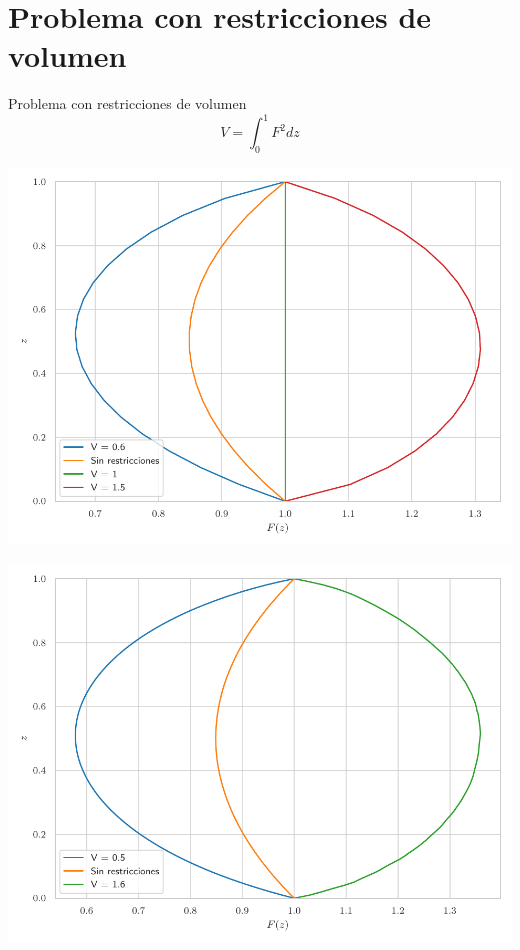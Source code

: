 \documentclass[11pt]{beamer}
\begin{document}
	\section{Problema con restricciones de volumen}
		\begin{frame}{Problema con restricciones de volumen}
			\centering
                \begin{equation*}
                    V = \int_0^1 F^2 dz
                \end{equation*}
			\begin{minipage}[b]{0.48\textwidth}
                    \centering
                    \includegraphics[height=0.5 \textheight]{Figuras/vol_inic.pdf}
                \end{minipage}
                \hfill
                \begin{minipage}[b]{0.48\textwidth}
                    \centering
                    \includegraphics[height=0.5 \textheight]{Figuras/vol_sol_n100.pdf}
                \end{minipage}
		\end{frame}
\end{document}
